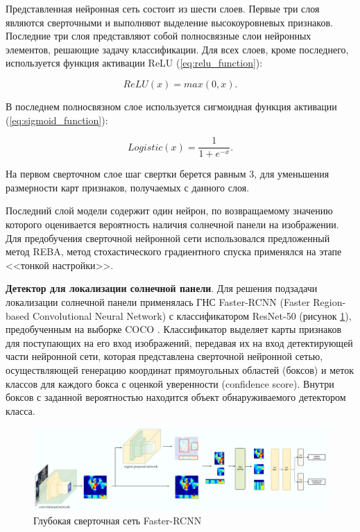 Представленная нейронная сеть состоит из шести слоев. Первые три слоя являются сверточными и выполняют выделение высокоуровневых признаков. Последние три слоя представляют собой полносвязные слои нейронных элементов, решающие задачу классификации. Для всех слоев, кроме последнего, используется функция активации ReLU (\ref{eq:relu_function}):

\begin{equation}
    \label{eq:relu_function}
    ReLU(x) = max(0, x).
\end{equation}

В последнем полносвязном слое используется сигмоидная функция активации (\ref{eq:sigmoid_function}):

\begin{equation}
    \label{eq:sigmoid_function}
    Logistic(x) = \frac{1}{1+e^{-x}}.
\end{equation}

На первом сверточном слое шаг свертки берется равным 3, для уменьшения размерности карт признаков, получаемых с данного слоя.

Последний слой модели содержит один нейрон, по возвращаемому значению которого оценивается вероятность наличия солнечной панели на изображении. Для предобучения сверточной нейронной сети использовался предложенный метод REBA, метод стохастического градиентного спуска применялся на этапе <<тонкой настройки>>. 

\textbf{Детектор для локализации солнечной панели}. Для решения подзадачи локализации солнечной панели применялась ГНС Faster-RCNN (Faster Region-based Convolutional Neural Network) с классификатором ResNet-50 (рисунок \ref{fig:faster_rcnn}), предобученным на выборке COCO \cite[c.~2]{lin2015}. Классификатор выделяет карты признаков для поступающих на его вход изображений, передавая их на вход детектирующей части нейронной сети, которая представлена сверточной нейронной сетью, осуществляющей генерацию координат прямоугольных областей (боксов) и меток классов для каждого бокса с оценкой уверенности (confidence score). Внутри боксов с заданной вероятностью находится объект обнаруживаемого детектором класса.

\begin{figure}[ht]
	\centering
	\includegraphics[width=17cm]{man-source/images/ch4/pic4-21.jpg}
	\caption{Глубокая сверточная сеть Faster-RCNN}
	\label{fig:faster_rcnn}
\end{figure}

